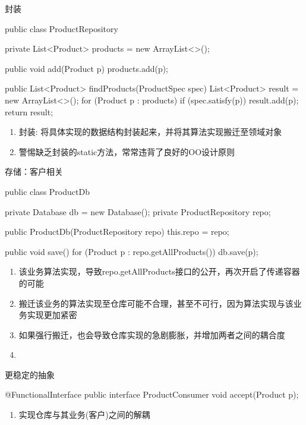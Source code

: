 \begin{frame}[fragile]{封装}
  \begin{java}
public class ProductRepository {
  private List<Product> products = new ArrayList<>();

  public void add(Product p) {
    products.add(p);
  }

  public List<Product> findProducts(ProductSpec spec) {
    List<Product> result = new ArrayList<>();
    for (Product p : products) {
      if (spec.satisfy(p)) {
        result.add(p);
      }
    }
    return result;
  }
}
  \end{java}

\begin{enumerate}
  \item 封装: 将具体实现的数据结构封装起来，并将其算法实现搬迁至领域对象
  \item 警惕缺乏封装的static方法，常常违背了良好的OO设计原则  
\end{enumerate}          
\end{frame}

\begin{frame}[fragile]{存储：客户相关}
  \begin{java}
public class ProductDb {
  private Database db = new Database();
  private ProductRepository repo;

  public ProductDb(ProductRepository repo) {
    this.repo = repo;
  }

  public void save() {
    for (Product p : repo.getAllProducts()) {
      db.save(p);
    }
  }
}
  \end{java}

  \begin{enumerate}
    \item 该业务算法实现，导致repo.getAllProducts接口的公开，再次开启了传递容器的可能
    \item 搬迁该业务的算法实现至仓库可能不合理，甚至不可行，因为算法实现与该业务实现更加紧密
    \item 如果强行搬迁，也会导致仓库实现的急剧膨胀，并增加两者之间的耦合度
    \item          
  \end{enumerate}
\end{frame}

\begin{frame}[fragile]{更稳定的抽象}
  \begin{java}
@FunctionalInterface
public interface ProductConsumer {
  void accept(Product p);
}
  \end{java}

\begin{enumerate}
  \item 实现仓库与其业务(客户)之间的解耦
\end{enumerate}
\end{frame}

